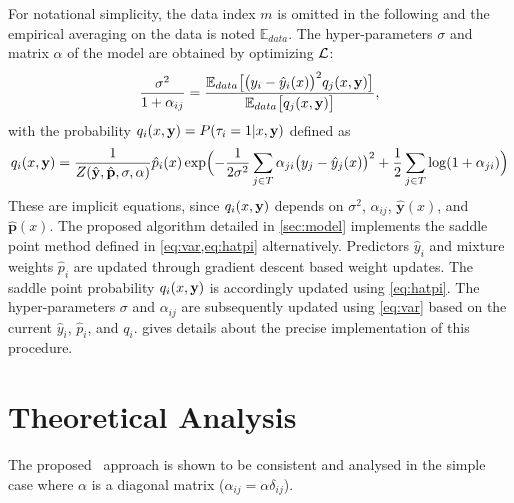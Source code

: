 For notational simplicity, the data index $m$ is omitted in the following and the empirical 
averaging on the data is noted ${\mathbb E}_{data}$. The hyper-parameters $\sigma$ and matrix 
$\alpha$ of the model are obtained by optimizing  ${\cal L}$:
%
\begin{equation}\label{eq:var}
  \frac{\sigma^2}{1+\alpha_{ij}} = 
  \frac{
    {\mathbb E}_{data}\bigl[\bigl(y_i-\hat y_i(x)\bigr)^2q_j(x,{\bf y})\bigr]
  }{
    {\mathbb E}_{data}\bigl[q_j(x,{\bf y})\bigr]
  },
\end{equation}
%
with the probability $q_i(x,{\bf y}) = P(\tau_i=1\vert x,{\bf y})$ defined as
%
\begin{equation}\label{eq:hatpi}
  q_i(x,{\bf y}) = \frac{1}{
    Z(\hat {\bf y},\hat{\bf p},\sigma,{\bf \alpha})
  } \hat p_i(x) 
  \exp\Bigl(
    - \frac{1}{2\sigma^2}\sum_{j\in T}\alpha_{ji}\bigl(y_j-\hat y_j(x)\bigr)^2 
    + \frac{1}{2}\sum_{j\in T}\log(1+\alpha_{ji})
  \Bigr)
\end{equation}
%
%
These are implicit equations, since $q_i(x,{\bf y})$ depends on $\sigma^2$, $\alpha_{ij}$, 
$\hat{\mathbf{y}}(x)$, and $\hat{\mathbf{p}}(x)$. The proposed algorithm detailed 
in \cref{sec:model} implements the saddle point method defined in \cref{eq:var,eq:hatpi} 
alternatively. Predictors $\hat y_i$ and mixture weights $\hat p_i$ are updated through 
gradient descent based weight updates. The saddle point probability $q_i(x,{\bf y})$ is accordingly 
updated using \cref{eq:hatpi}. The hyper-parameters $\sigma$ and $\alpha_{ij}$ are subsequently 
updated using \cref{eq:var} based on the current $\hat y_i$, $\hat p_i$, and $q_i$. 
 gives details about the precise implementation of this procedure.


\section{Theoretical Analysis}\label{sec:dtlrtheory}
The proposed \XX\ approach is shown to be consistent and analysed in the simple case where $\alpha$ 
is a diagonal matrix ($\alpha_{ij} = \alpha\delta_{ij}$).

